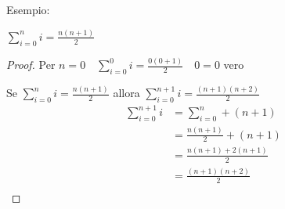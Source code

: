Esempio:\newline
\begin{thm}$\displaystyle \sum_{i = 0} ^ n i = \frac{n(n + 1)}{2}$ \end{thm}

\begin{proof}
Per $n = 0 \quad \displaystyle \sum_{i = 0} ^ 0 i = \frac{0(0 + 1)}{2} \quad 0 = 0$ vero

Se $\displaystyle \sum_{i = 0} ^ n i = \frac{n(n+1)}{2}$ allora
$\displaystyle \sum_{i = 0} ^ {n+1} i = \frac{(n+1)(n+2)}{2}$
\begin{equation*}
\begin{split}
  \sum_{i = 0}^{n+1} i & = \sum_{i = 0} ^ n + (n+1) \\
                     & = \frac{n(n+1)}{2} + (n+1) \\
                     & = \frac{n(n+1) + 2(n+1)}{2} \\
                     & = \frac{(n+1)(n+2)}{2} \\
\end{split}
\end{equation*}
\end{proof}
